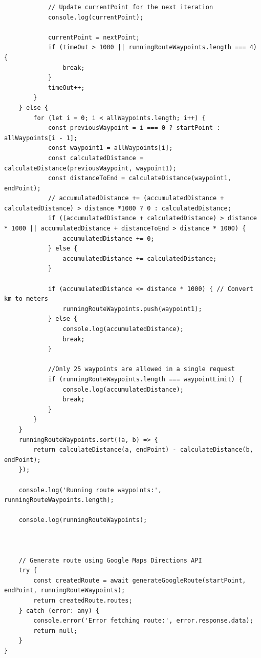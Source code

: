 \begin{lstlisting}
            // Update currentPoint for the next iteration
            console.log(currentPoint);

            currentPoint = nextPoint;
            if (timeOut > 1000 || runningRouteWaypoints.length === 4) {
                break;
            }
            timeOut++;
        }
    } else {
        for (let i = 0; i < allWaypoints.length; i++) {
            const previousWaypoint = i === 0 ? startPoint : allWaypoints[i - 1];
            const waypoint1 = allWaypoints[i];
            const calculatedDistance = calculateDistance(previousWaypoint, waypoint1);
            const distanceToEnd = calculateDistance(waypoint1, endPoint);
            // accumulatedDistance += (accumulatedDistance + calculatedDistance) > distance *1000 ? 0 : calculatedDistance;
            if ((accumulatedDistance + calculatedDistance) > distance * 1000 || accumulatedDistance + distanceToEnd > distance * 1000) {
                accumulatedDistance += 0;
            } else {
                accumulatedDistance += calculatedDistance;
            }

            if (accumulatedDistance <= distance * 1000) { // Convert km to meters
                runningRouteWaypoints.push(waypoint1);
            } else {
                console.log(accumulatedDistance);
                break;
            }

            //Only 25 waypoints are allowed in a single request
            if (runningRouteWaypoints.length === waypointLimit) {
                console.log(accumulatedDistance);
                break;
            }
        }
    }
    runningRouteWaypoints.sort((a, b) => {
        return calculateDistance(a, endPoint) - calculateDistance(b, endPoint);
    });

    console.log('Running route waypoints:', runningRouteWaypoints.length);

    console.log(runningRouteWaypoints);



    // Generate route using Google Maps Directions API
    try {
        const createdRoute = await generateGoogleRoute(startPoint, endPoint, runningRouteWaypoints);
        return createdRoute.routes;
    } catch (error: any) {
        console.error('Error fetching route:', error.response.data);
        return null;
    }
}
\end{lstlisting}


